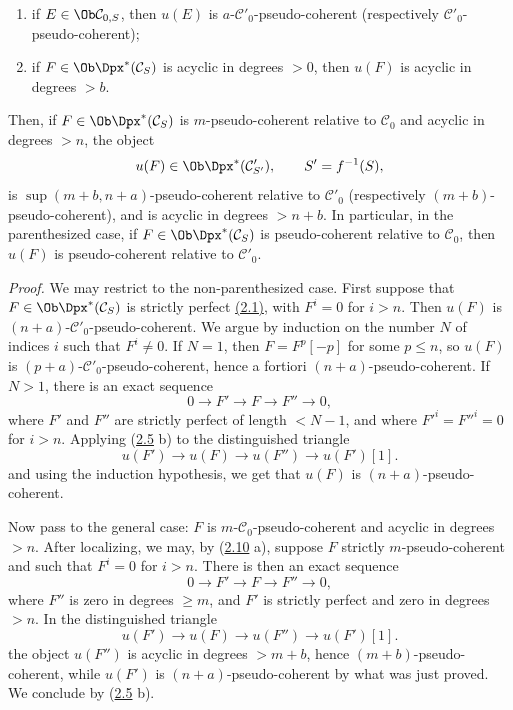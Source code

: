 \begin{enumerate}[label=(\roman*)]
\item if \(E\in\Ob\mathcal C_{0,S}\), then \(u(E)\) is \(a\)-\(\mathcal C'_0\)-pseudo-coherent (respectively \(\mathcal C'_0\)-pseudo-coherent);
\item if \(F\in\Ob\Dpx^*(\mathcal C_S)\) is acyclic in degrees \(>0\), then \(u(F)\) is acyclic in degrees \(>b\).
\end{enumerate}

Then, if \(F\in\Ob\Dpx^*(\mathcal C_S)\) is \(m\)-pseudo-coherent relative to \(\mathcal C_0\) and acyclic in degrees \(>n\), the object
\[
  u(F)\in\Ob\Dpx^*(\mathcal C'_{S'}),\qquad S'=f^{-1}(S),
\]
is \(\sup(m+b,n+a)\)-pseudo-coherent relative to \(\mathcal C'_0\) (respectively \((m+b)\)-pseudo-coherent), and is acyclic in degrees \(>n+b\). In particular, in the parenthesized case, if \(F\in\Ob\Dpx^*(\mathcal C_S)\) is pseudo-coherent relative to \(\mathcal C_0\), then \(u(F)\) is pseudo-coherent relative to \(\mathcal C'_0\).

\emph{Proof.} We may restrict to the non-parenthesized case. First suppose that \(F\in\Ob\Dpx^*(\mathcal C_S)\) is strictly perfect \hyperlink{sga6.e01.def.2-1}{(2.1)}, with \(F^i=0\) for \(i>n\). Then \(u(F)\) is \((n+a)\)-\(\mathcal C'_0\)-pseudo-coherent. We argue by induction on the number \(N\) of indices \(i\) such that \(F^i\neq0\). If \(N=1\), then \(F=F^p[-p]\) for some \(p\leq n\), so \(u(F)\) is \((p+a)\)-\(\mathcal C'_0\)-pseudo-coherent, hence a fortiori \((n+a)\)-pseudo-coherent. If \(N>1\), there is an exact sequence
\[
  0\longrightarrow F'\longrightarrow F\longrightarrow F''\longrightarrow 0,
\]
where \(F'\) and \(F''\) are strictly perfect of length \(<N-1\), and where \(F'^i=F''^i=0\) for \(i>n\). Applying (\hyperlink{sga6.e01.prop.2-5}{2.5} b) to the distinguished triangle
\[
  u(F')\longrightarrow u(F)\longrightarrow u(F'')\longrightarrow u(F')[1].
\]
and using the induction hypothesis, we get that \(u(F)\) is \((n+a)\)-pseudo-coherent.

Now pass to the general case: \(F\) is \(m\)-\(\mathcal C_0\)-pseudo-coherent and acyclic in degrees \(>n\). After localizing, we may, by (\hyperlink{sga6.e01.prop.2-10}{2.10} a), suppose \(F\) strictly \(m\)-pseudo-coherent and such that \(F^i=0\) for \(i>n\). There is then an exact sequence
\[
  0\longrightarrow F'\longrightarrow F\longrightarrow F''\longrightarrow 0,
\]
where \(F''\) is zero in degrees \(\geq m\), and \(F'\) is strictly perfect and zero in degrees \(>n\). In the distinguished triangle
\[
  u(F')\longrightarrow u(F)\longrightarrow u(F'')\longrightarrow u(F')[1].
\]
the object \(u(F'')\) is acyclic in degrees \(>m+b\), hence \((m+b)\)-pseudo-coherent, while \(u(F')\) is \((n+a)\)-pseudo-coherent by what was just proved. We conclude by (\hyperlink{sga6.e01.prop.2-5}{2.5} b).

